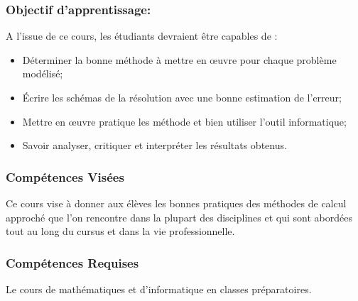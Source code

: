 \documentclass{article}
\begin{document}
\subsubsection*{Objectif d'apprentissage:}
A l'issue de ce cours,  les étudiants devraient être capables de :
\begin{itemize}
\item Déterminer la bonne méthode à mettre en œuvre pour chaque problème modélisé;
\item Écrire les schémas de la résolution avec une bonne estimation de l'erreur;
\item Mettre en œuvre pratique les méthode et bien utiliser l'outil  informatique;
\item Savoir analyser, critiquer et interpréter les résultats obtenus.
\end{itemize}

\subsubsection*{Compétences Visées}
Ce cours vise à donner aux élèves les bonnes pratiques des méthodes de calcul approché  que l'on rencontre dans la plupart des disciplines et qui sont abordées tout au long du cursus et dans la vie professionnelle.
\subsubsection*{Compétences Requises}
Le cours de mathématiques et d'informatique en classes préparatoires.
\end{document}
